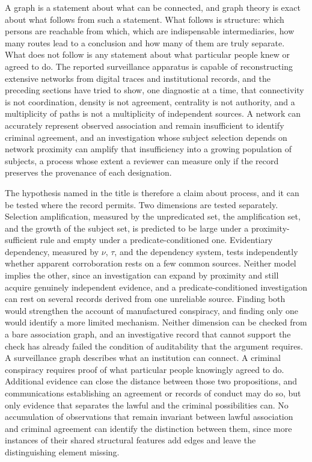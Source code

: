 \documentclass[11pt]{article}
\theoremstyle{definition}
\theoremstyle{remark}
\begin{document}
A graph is a statement about what can be connected, and graph theory is exact about what follows from such a statement. What follows is structure: which persons are reachable from which, which are indispensable intermediaries, how many routes lead to a conclusion and how many of them are truly separate. What does not follow is any statement about what particular people knew or agreed to do. The reported surveillance apparatus is capable of reconstructing extensive networks from digital traces and institutional records, and the preceding sections have tried to show, one diagnostic at a time, that connectivity is not coordination, density is not agreement, centrality is not authority, and a multiplicity of paths is not a multiplicity of independent sources. A network can accurately represent observed association and remain insufficient to identify criminal agreement, and an investigation whose subject selection depends on network proximity can amplify that insufficiency into a growing population of subjects, a process whose extent a reviewer can measure only if the record preserves the provenance of each designation.

The hypothesis named in the title is therefore a claim about process, and it can be tested where the record permits. Two dimensions are tested separately. Selection amplification, measured by the unpredicated set, the amplification set, and the growth of the subject set, is predicted to be large under a proximity-sufficient rule and empty under a predicate-conditioned one. Evidentiary dependency, measured by $\nu$, $\tau$, and the dependency system, tests independently whether apparent corroboration rests on a few common sources. Neither model implies the other, since an investigation can expand by proximity and still acquire genuinely independent evidence, and a predicate-conditioned investigation can rest on several records derived from one unreliable source. Finding both would strengthen the account of manufactured conspiracy, and finding only one would identify a more limited mechanism. Neither dimension can be checked from a bare association graph, and an investigative record that cannot support the check has already failed the condition of auditability that the argument requires. A surveillance graph describes what an institution can connect. A criminal conspiracy requires proof of what particular people knowingly agreed to do. Additional evidence can close the distance between those two propositions, and communications establishing an agreement or records of conduct may do so, but only evidence that separates the lawful and the criminal possibilities can. No accumulation of observations that remain invariant between lawful association and criminal agreement can identify the distinction between them, since more instances of their shared structural features add edges and leave the distinguishing element missing.
\end{document}
